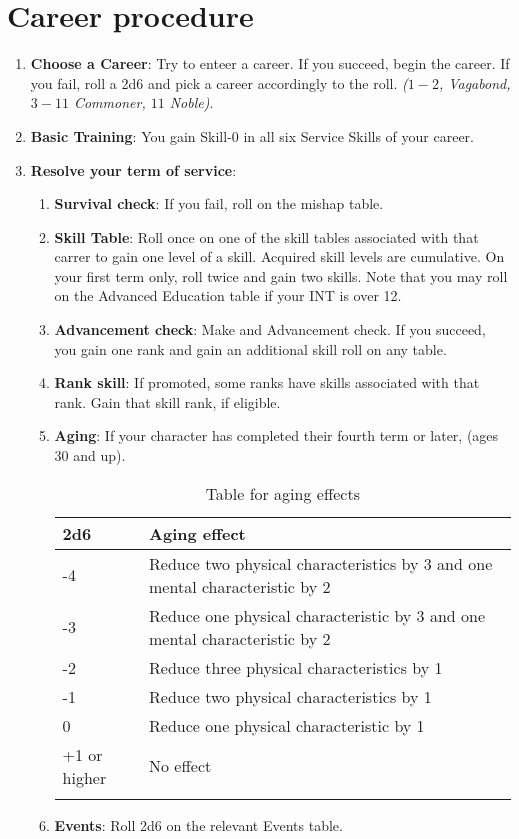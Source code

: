 \documentclass[itdr/core]{subfiles}
\begin{document}
\section{Career procedure}
\begin{enumerate}

  \item \textbf{Choose a Career}: Try to enteer a career. If you succeed, begin the career. If you fail, roll a 2d6 and
  pick a career accordingly to the roll. \emph{($1-2$, Vagabond, $3-11$ Commoner, $11$ Noble)}.

\item \textbf{Basic Training}: You gain Skill-0 in all six Service Skills of your career.

\item \textbf{Resolve your term of service}:
  \begin{enumerate}
    \item \textbf{Survival check}: If you fail, roll on the mishap table.
\item \textbf{Skill Table}: Roll once on one of the skill tables associated with that carrer to gain one level of a skill. Acquired skill levels are cumulative. On your first term only, roll twice and gain two skills. Note that you may roll on the Advanced Education table if your INT is over 12. 
\item \textbf{Advancement check}: Make and Advancement check. If you succeed, you gain one rank and gain an additional skill roll on any table.

\item \textbf{Rank skill}: If promoted, some ranks have skills associated with that rank. Gain that skill rank, if eligible.
\item \textbf{Aging}: If your character has completed their fourth term or later, (ages 30 and up).%

\begin{longtable}{p{} p{}} %
\hline
\textbf{2d6} & \textbf{Aging effect} \\
\hline
-4 & Reduce two physical characteristics by 3 and one mental characteristic by 2 \\ 
-3 & Reduce one physical characteristic by 3 and one mental characteristic by 2 \\
-2 & Reduce three physical characteristics by 1 \\ 
-1 & Reduce two physical characteristics by 1 \\
 0 & Reduce one physical characteristic by 1 \\ 
+1 or higher & No effect \\
\hline
\caption{Table for aging effects}
\label{tab:aging}
\end{longtable}
  \item \textbf{Events}: Roll 2d6 on the relevant Events table.


\end{enumerate}
\end{enumerate}
\end{document}
